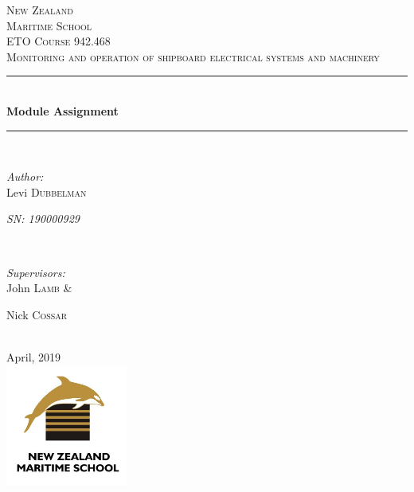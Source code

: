 \documentclass[11pt,a4paper]{article}
\begin{document}
\begin{titlepage}

\newcommand{\HRule}{\rule{\linewidth}{0.5mm}} %

\center %


\textsc{\LARGE New Zealand}\\[0.5cm]

\textsc{\LARGE  Maritime School}\\[1.5cm]
\textsc{\Large ETO Course 942.468}\\[0.2cm] %
\textsc{\large Monitoring and operation of shipboard electrical systems and machinery}\\[0.5cm] %


\HRule \\[0.5cm]
{ \huge \bfseries Module Assignment}\\[0.2cm] %
\HRule \\[0.5cm]
\begin{minipage}{0.4\textwidth}
\begin{flushleft} \large
\emph{Author:}\\
Levi \textsc{Dubbelman}

\textit{SN: 190000929}\par
\end{flushleft}
\end{minipage}
~
\begin{minipage}{0.4\textwidth}
\begin{flushright} \large
\emph{Supervisors:} \\
John \textsc{Lamb} \&

Nick \textsc{Cossar}
\end{flushright}
\end{minipage}\\[2cm]
{\large April, 2019}\\[2cm]
\includegraphics[width=4cm]{logo.png}
\vfill

\end{titlepage}
\end{document}
